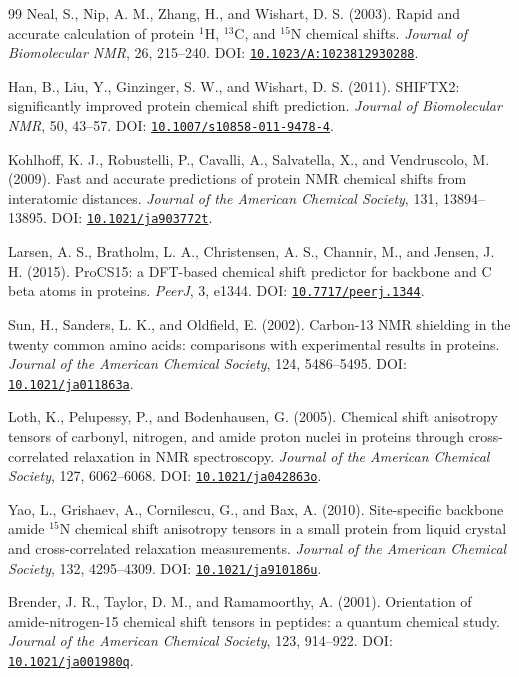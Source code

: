 \documentclass[11pt]{article}
\newcommand{\doi}[1]{\href{https://doi.org/#1}{\nolinkurl{#1}}}
\begin{document}
\begin{thebibliography}{99}
Neal, S., Nip, A. M., Zhang, H., and Wishart, D. S. (2003).
Rapid and accurate calculation of protein \(^{1}\mathrm H\),
\(^{13}\mathrm C\), and \(^{15}\mathrm N\) chemical shifts.
\emph{Journal of Biomolecular NMR}, 26, 215--240.
DOI: \doi{10.1023/A:1023812930288}.

Han, B., Liu, Y., Ginzinger, S. W., and Wishart, D. S. (2011).
SHIFTX2: significantly improved protein chemical shift prediction.
\emph{Journal of Biomolecular NMR}, 50, 43--57.
DOI: \doi{10.1007/s10858-011-9478-4}.

Kohlhoff, K. J., Robustelli, P., Cavalli, A., Salvatella, X., and
Vendruscolo, M. (2009).
Fast and accurate predictions of protein NMR chemical shifts from interatomic
distances.
\emph{Journal of the American Chemical Society}, 131, 13894--13895.
DOI: \doi{10.1021/ja903772t}.

Larsen, A. S., Bratholm, L. A., Christensen, A. S., Channir, M., and
Jensen, J. H. (2015).
ProCS15: a DFT-based chemical shift predictor for backbone and C beta atoms
in proteins.
\emph{PeerJ}, 3, e1344.
DOI: \doi{10.7717/peerj.1344}.

Sun, H., Sanders, L. K., and Oldfield, E. (2002).
Carbon-13 NMR shielding in the twenty common amino acids: comparisons with
experimental results in proteins.
\emph{Journal of the American Chemical Society}, 124, 5486--5495.
DOI: \doi{10.1021/ja011863a}.

Loth, K., Pelupessy, P., and Bodenhausen, G. (2005).
Chemical shift anisotropy tensors of carbonyl, nitrogen, and amide proton
nuclei in proteins through cross-correlated relaxation in NMR spectroscopy.
\emph{Journal of the American Chemical Society}, 127, 6062--6068.
DOI: \doi{10.1021/ja042863o}.

Yao, L., Grishaev, A., Cornilescu, G., and Bax, A. (2010).
Site-specific backbone amide \(^{15}\mathrm N\) chemical shift anisotropy
tensors in a small protein from liquid crystal and cross-correlated
relaxation measurements.
\emph{Journal of the American Chemical Society}, 132, 4295--4309.
DOI: \doi{10.1021/ja910186u}.

Brender, J. R., Taylor, D. M., and Ramamoorthy, A. (2001).
Orientation of amide-nitrogen-15 chemical shift tensors in peptides: a
quantum chemical study.
\emph{Journal of the American Chemical Society}, 123, 914--922.
DOI: \doi{10.1021/ja001980q}.


\end{thebibliography}
\end{document}
